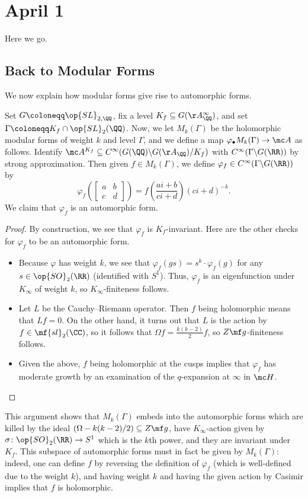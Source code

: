 \documentclass[../notes.tex]{subfiles}
\begin{document}
\section{April 1}
Here we go.

\subsection{Back to Modular Forms}
We now explain how modular forms give rise to automorphic forms.
\begin{exe}
	Set $G\coloneqq\op{SL}_{2,\QQ}$, fix a level $K_f\subseteq G(\AA_\QQ^\infty)$, and set $\Gamma\coloneqq K_f\cap\op{SL}_2(\QQ)$. Now, we let $M_k(\Gamma)$ be the holomorphic modular forms of weight $k$ and level $\Gamma$, and we define a map $\varphi_\bullet M_k(\Gamma)\to\mc A$ as follows. Identify $\mc A^{K_f}\subseteq C^\infty(G(\QQ)\backslash G(\AA_\QQ)/K_f)$ with $C^\infty(\Gamma\backslash G(\RR))$ by strong approximation. Then given $f\in M_k(\Gamma)$, we define $\varphi_f\in C^\infty(\Gamma\backslash G(\RR))$ by
	\[\varphi_f\left(\begin{bmatrix}
		a & b \\ c & d
	\end{bmatrix}\right)=f\left(\frac{ai+b}{ci+d}\right)(ci+d)^{-k}.\]
	We claim that $\varphi_f$ is an automorphic form.
\end{exe}
\begin{proof}
	By construction, we see that $\varphi_f$ is $K_f$-invariant. Here are the other checks for $\varphi_f$ to be an automorphic form.
	\begin{itemize}
		\item Because $\varphi$ has weight $k$, we see that $\varphi_f(gs)=s^k\cdot\varphi_f(g)$ for any $s\in\op{SO}_2(\RR)$ (identified with $S^1$). Thus, $\varphi_f$ is an eigenfunction under $K_\infty$ of weight $k$, so $K_\infty$-finiteness follows.
		\item Let $L$ be the Cauchy--Riemann operator. Then $f$ being holomorphic means that $Lf=0$. On the other hand, it turns out that $L$ is the action by $f\in\mf{sl}_2(\CC)$, so it follows that $\Omega f=\frac{k(k-2)}2f$, so $Z\mf g$-finiteness follows.
		\item Given the above, $f$ being holomorphic at the cusps implies that $\varphi_f$ has moderate growth by an examination of the $q$-expansion at $\infty$ in $\mc H$.
		\qedhere
	\end{itemize} 
\end{proof}
\begin{remark} \label{rem:mk-gamma-as-automorphic}
	This argument shows that $M_k(\Gamma)$ embeds into the automorphic forms which are killed by the ideal $\left(\Omega-k(k-2)/2\right)\subseteq Z\mf g$, have $K_\infty$-action given by $\sigma\colon\op{SO}_2(\RR)\to S^1$ which is the $k$th power, and they are invariant under $K_f$. This subspace of automorphic forms must in fact be given by $M_k(\Gamma)$: indeed, one can define $f$ by reversing the definition of $\varphi_f$ (which is well-defined due to the weight $k$), and having weight $k$ and having the given action by Casimir implies that $f$ is holomorphic.
\end{remark}
\end{document}
